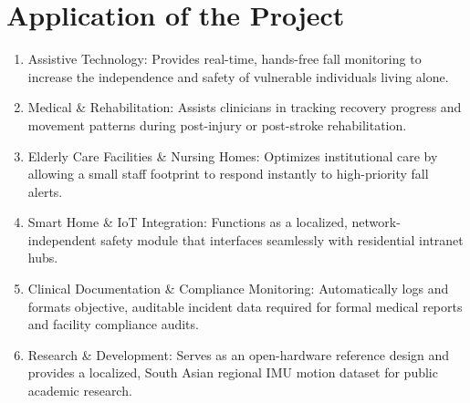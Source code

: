 \section{Application of the Project}
\begin{enumerate}

\item Assistive Technology: Provides real-time, hands-free fall monitoring to increase the independence and safety of vulnerable individuals living alone.

\item Medical \& Rehabilitation: Assists clinicians in tracking recovery progress and movement patterns during post-injury or post-stroke rehabilitation.

\item Elderly Care Facilities \& Nursing Homes: Optimizes institutional care by allowing a small staff footprint to respond instantly to high-priority fall alerts.

\item Smart Home \& IoT Integration: Functions as a localized, network-independent safety module that interfaces seamlessly with residential intranet hubs.

\item Clinical Documentation \& Compliance Monitoring: Automatically logs and formats objective, auditable incident data required for formal medical reports and facility compliance audits.

\item Research \& Development: Serves as an open-hardware reference design and provides a localized, South Asian regional IMU motion dataset for public academic research.
\end{enumerate}
